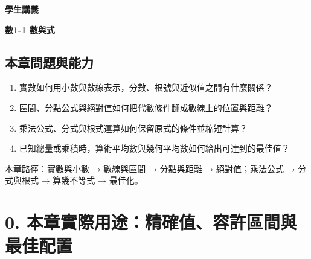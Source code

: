 \documentclass[11pt,a4paper]{article}
\providecommand{\tightlist}{%
  \setlength{\itemsep}{0pt}\setlength{\parskip}{0pt}}
\begin{document}
\begin{tcolorbox}[
  enhanced,colback=white,colframe=HandoutBlue,boxrule=1.1pt,arc=2mm,
  borderline west={3pt}{0pt}{HandoutBlue},left=5mm,right=4mm,top=4mm,bottom=4mm
]
{\sffamily\small\bfseries\color{HandoutBlue}學生講義}\par
{\sffamily\bfseries\LARGE\color{HandoutInk}數1-1 數與式}\par
\vspace{0.35em}{\large 用數線整理實數，以代數結構控制式的運算與最佳化}\par
{}\par
{}\par
\end{tcolorbox}


\begin{HandoutLearningMap}

\subsection{本章問題與能力}\label{ux672cux7ae0ux554fux984cux8207ux80fdux529b}

\begin{enumerate}
\def\labelenumi{\arabic{enumi}.}
\tightlist
\item
  實數如何用小數與數線表示，分數、根號與近似值之間有什麼關係？
\item
  區間、分點公式與絕對值如何把代數條件翻成數線上的位置與距離？
\item
  乘法公式、分式與根式運算如何保留原式的條件並縮短計算？
\item
  已知總量或乘積時，算術平均數與幾何平均數如何給出可達到的最佳值？
\end{enumerate}

本章路徑：實數與小數 → 數線與區間 → 分點與距離 → 絕對值；乘法公式 → 分式與根式 → 算幾不等式 → 最佳化。

\end{HandoutLearningMap}

\section{0. 本章實際用途：精確值、容許區間與最佳配置}\label{ux672cux7ae0ux5be6ux969bux7528ux9014ux7cbeux78baux503cux5bb9ux8a31ux5340ux9593ux8207ux6700ux4f73ux914dux7f6e}
\end{document}
